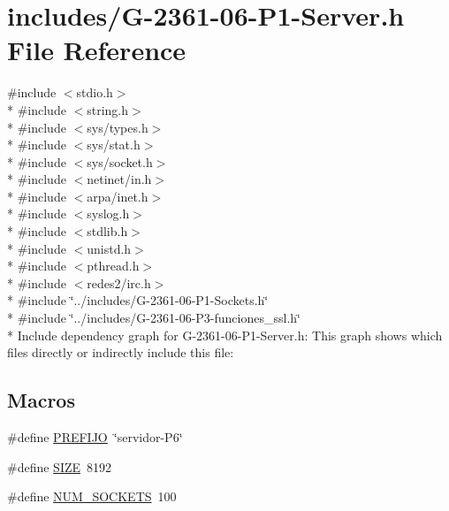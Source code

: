 \hypertarget{_g-2361-06-_p1-_server_8h}{}\section{includes/\+G-\/2361-\/06-\/\+P1-\/\+Server.h File Reference}
\label{_g-2361-06-_p1-_server_8h}
{\ttfamily \#include $<$stdio.\+h$>$}\\*
{\ttfamily \#include $<$string.\+h$>$}\\*
{\ttfamily \#include $<$sys/types.\+h$>$}\\*
{\ttfamily \#include $<$sys/stat.\+h$>$}\\*
{\ttfamily \#include $<$sys/socket.\+h$>$}\\*
{\ttfamily \#include $<$netinet/in.\+h$>$}\\*
{\ttfamily \#include $<$arpa/inet.\+h$>$}\\*
{\ttfamily \#include $<$syslog.\+h$>$}\\*
{\ttfamily \#include $<$stdlib.\+h$>$}\\*
{\ttfamily \#include $<$unistd.\+h$>$}\\*
{\ttfamily \#include $<$pthread.\+h$>$}\\*
{\ttfamily \#include $<$redes2/irc.\+h$>$}\\*
{\ttfamily \#include \char`\"{}../includes/\+G-\/2361-\/06-\/\+P1-\/\+Sockets.\+h\char`\"{}}\\*
{\ttfamily \#include \char`\"{}../includes/\+G-\/2361-\/06-\/\+P3-\/funciones\+\_\+ssl.\+h\char`\"{}}\\*
Include dependency graph for G-\/2361-\/06-\/\+P1-\/\+Server.h\+:
This graph shows which files directly or indirectly include this file\+:
\subsection*{Macros}
\begin{DoxyCompactItemize}
\item 
\#define \hyperlink{_g-2361-06-_p1-_server_8h_a78c658ff923693099f7b621e7c351129}{P\+R\+E\+F\+I\+JO}~\char`\"{}servidor-\/P6\char`\"{}
\item 
\#define \hyperlink{_g-2361-06-_p1-_server_8h_a70ed59adcb4159ac551058053e649640}{S\+I\+ZE}~8192
\item 
\#define \hyperlink{_g-2361-06-_p1-_server_8h_a1c803e4ececfb47d2791c9283c85eb00}{N\+U\+M\+\_\+\+S\+O\+C\+K\+E\+TS}~100
\end{DoxyCompactItemize}
